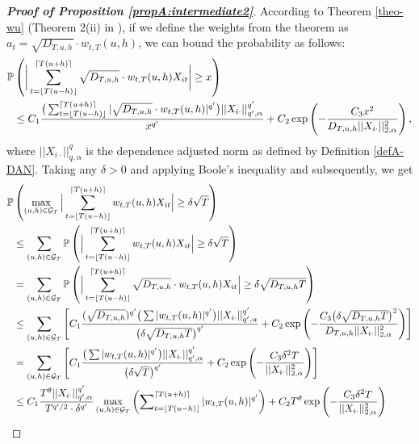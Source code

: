 \documentclass[a4paper,12pt]{article}
\makeatletter
\renewcommand{\eqref}[1]{\tagform@{\ref{#1}}}
\makeatother
\begin{document}
\begin{proof}[\textnormal{\textbf{Proof of Proposition \ref{propA:intermediate2}}}]
According to Theorem \ref{theo-wu} (Theorem 2(ii) in \cite{Wu2016}), if we define the weights from the theorem as $a_t = \sqrt{D_{T, u, h}}\cdot w_{t,T}(u,h)$, we can bound the probability as follows:
\begin{align}\label{ineq-diff-8}
\begin{split}
\mathbb{P}&\left(\bigg| \sum_{t=\lfloor T(u-h) \rfloor}^{\lceil T(u+h) \rceil} \sqrt{D_{T, u, h}}\cdot w_{t,T}(u,h)X_{it}  \bigg| \geq x\right) \\
&\leq C_1 \frac{\big( \sum_{t=\lfloor T(u-h) \rfloor}^{\lceil T(u+h) \rceil} |\sqrt{D_{T, u, h}}\cdot w_{t,T}(u,h)|^{q^\prime}\big) ||X_{i\cdot}||^{q^\prime}_{q^\prime, \alpha}}{ x^{q^\prime}} + C_2 \exp \left(-\frac{C_3  x^2}{D_{T, u, h}||X_{i\cdot}||^{2}_{2, \alpha}}\right),
\end{split}
\end{align}
where $||X_{i\cdot}||^{q}_{q, \alpha}$ is the dependence adjusted norm as defined by Definition \ref{defA-DAN}. Taking any $\delta>0$ and applying Boole's inequality and \eqref{ineq-diff-8} subsequently, we get
\begin{align*}
\pr&\left(\max_{(u, h) \in \mathcal{G}_T} \Big| \sum_{t=\lfloor T(u-h) \rfloor}^{\lceil T(u+h) \rceil} w_{t,T}(u,h)X_{it}  \Big| \geq \delta \sqrt{T} \right) \\
&\leq \sum_{(u, h) \in \mathcal{G}_T} \pr \left( \Big| \sum_{t=\lfloor T(u-h) \rfloor}^{\lceil T(u+h) \rceil} w_{t,T}(u,h)X_{it}  \Big| \geq \delta \sqrt{T} \right) \\
&= \sum_{(u, h) \in \mathcal{G}_T} \pr \left( \Big| \sum_{t=\lfloor T(u-h) \rfloor}^{\lceil T(u+h) \rceil} \sqrt{D_{T, u, h}}\cdot w_{t,T}(u,h)X_{it}  \Big| \geq \delta\sqrt{D_{T, u, h}T}  \right)  \\
&\leq \sum_{(u, h) \in \mathcal{G}_T} \left[C_1 \frac{(\sqrt{D_{T, u, h}})^{q^\prime}\big( \sum |w_{t,T}(u,h)|^{q^\prime}\big) ||X_{i\cdot}||^{q^\prime}_{q^\prime, \alpha}}{ \big(\delta\sqrt{D_{T, u, h}T}\big)^{q^\prime}} + C_2 \exp \left(-\frac{C_3 \big(\delta\sqrt{D_{T, u, h}T}\big)^2}{D_{T, u, h}||X_{i\cdot}||^{2}_{2, \alpha}}\right) \right] \\
&= \sum_{(u, h) \in \mathcal{G}_T} \left[C_1 \frac{\big( \sum |w_{t,T}(u,h)|^{q^\prime}\big) ||X_{i\cdot}||^{q^\prime}_{q^\prime, \alpha}}{ \big(\delta \sqrt{T}\big)^{q^\prime}} + C_2 \exp \left(-\frac{C_3 \delta^2 T }{||X_{i\cdot}||^{2}_{2, \alpha}}\right) \right] \\
&\leq C_1 \frac{ T^\theta ||X_{i\cdot}||^{q^\prime}_{q^\prime, \alpha}}{T^{q^\prime/2}\cdot \delta^{q^\prime}} \max_{(u, h) \in \mathcal{G}_T} \left( \sum\nolimits_{t=\lfloor T(u-h) \rfloor}^{\lceil T(u+h) \rceil} |w_{t,T}(u,h)|^{q^\prime}\right)+ C_2 T^\theta \exp \left(-\frac{C_3 \delta^2 T}{||X_{i\cdot}||^{2}_{2, \alpha}}\right) \\

\end{align*}
\end{proof}
\end{document}
